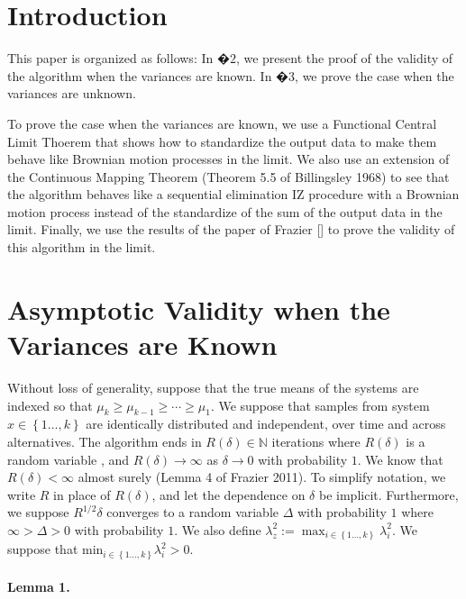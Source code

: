 \documentclass[11pt,english]{article}
\begin{document}
\section{Introduction}

This paper is organized as follows: In $\text{�}2$, we present the
proof of the validity of the algorithm when the variances are known.
In $\text{�}3$, we prove the case when the variances are unknown.

To prove the case when the variances are known, we use a Functional
Central Limit Thoerem that shows how to standardize the output data
to make them behave like Brownian motion processes in the limit. We
also use an extension of the Continuous Mapping Theorem (Theorem 5.5
of Billingsley 1968) to see that the algorithm behaves like a sequential
elimination IZ procedure with a Brownian motion process instead of
the standardize of the sum of the output data in the limit. Finally,
we use the results of the paper of Frazier {[}{]} to prove the validity
of this algorithm in the limit.


\section{Asymptotic Validity when the Variances are Known}

Without loss of generality, suppose that the true means of the systems
are indexed so that $\mu_{k}\geq\mu_{k-1}\geq\cdots\geq\mu_{1}$.
We suppose that samples from system $x\in\left\{ 1\ldots,k\right\} $
are identically distributed and independent, over time and across
alternatives. The algorithm ends in $R\left(\delta\right)\in\mathbb{N}$
iterations where $R\left(\delta\right)$ is a random variable , and
$R(\delta)\rightarrow\infty$ as $\delta\rightarrow0$ with probability
$1$. We know that $R\left(\delta\right)<\infty$ almost surely (Lemma
4 of Frazier 2011). To simplify notation, we write $R$ in place of
$R\left(\delta\right)$, and let the dependence on $\delta$ be implicit.
Furthermore, we suppose $R^{1/2}\delta$ converges to a random variable
$\Delta$ $ $with probability $1$ where $\infty>\Delta>0$ with
probability $1$. We also define $\lambda_{z}^{2}:=\max_{i\in\left\{ 1\ldots,k\right\} }\lambda_{i}^{2}$.
We suppose that $\mbox{min}{}_{i\in\left\{ 1\ldots,k\right\} }\lambda_{i}^{2}>0$.


\paragraph*{Lemma 1.}
\end{document}
